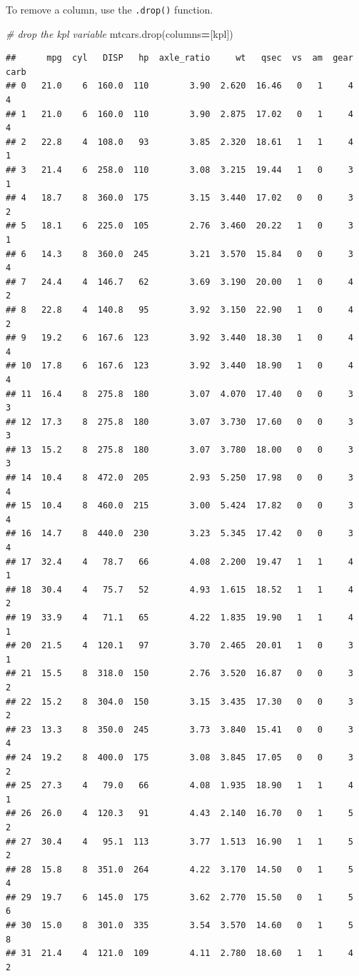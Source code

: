 \documentclass[
]{book}
\newenvironment{Shaded}{\begin{snugshade}}{\end{snugshade}}
\newcommand{\CommentTok}[1]{\textcolor[rgb]{0.56,0.35,0.01}{\textit{#1}}}
\newcommand{\NormalTok}[1]{#1}
\newcommand{\OperatorTok}[1]{\textcolor[rgb]{0.81,0.36,0.00}{\textbf{#1}}}
\newcommand{\StringTok}[1]{\textcolor[rgb]{0.31,0.60,0.02}{#1}}
\begin{document}
To remove a column, use the \texttt{.drop()} function.

\begin{Shaded}
\begin{Highlighting}[]
\CommentTok{\# drop the kpl variable}
\NormalTok{mtcars.drop(columns}\OperatorTok{=}\NormalTok{[}\StringTok{\textquotesingle{}kpl\textquotesingle{}}\NormalTok{])}
\end{Highlighting}
\end{Shaded}

\begin{verbatim}
##      mpg  cyl   DISP   hp  axle_ratio     wt   qsec  vs  am  gear  carb
## 0   21.0    6  160.0  110        3.90  2.620  16.46   0   1     4     4
## 1   21.0    6  160.0  110        3.90  2.875  17.02   0   1     4     4
## 2   22.8    4  108.0   93        3.85  2.320  18.61   1   1     4     1
## 3   21.4    6  258.0  110        3.08  3.215  19.44   1   0     3     1
## 4   18.7    8  360.0  175        3.15  3.440  17.02   0   0     3     2
## 5   18.1    6  225.0  105        2.76  3.460  20.22   1   0     3     1
## 6   14.3    8  360.0  245        3.21  3.570  15.84   0   0     3     4
## 7   24.4    4  146.7   62        3.69  3.190  20.00   1   0     4     2
## 8   22.8    4  140.8   95        3.92  3.150  22.90   1   0     4     2
## 9   19.2    6  167.6  123        3.92  3.440  18.30   1   0     4     4
## 10  17.8    6  167.6  123        3.92  3.440  18.90   1   0     4     4
## 11  16.4    8  275.8  180        3.07  4.070  17.40   0   0     3     3
## 12  17.3    8  275.8  180        3.07  3.730  17.60   0   0     3     3
## 13  15.2    8  275.8  180        3.07  3.780  18.00   0   0     3     3
## 14  10.4    8  472.0  205        2.93  5.250  17.98   0   0     3     4
## 15  10.4    8  460.0  215        3.00  5.424  17.82   0   0     3     4
## 16  14.7    8  440.0  230        3.23  5.345  17.42   0   0     3     4
## 17  32.4    4   78.7   66        4.08  2.200  19.47   1   1     4     1
## 18  30.4    4   75.7   52        4.93  1.615  18.52   1   1     4     2
## 19  33.9    4   71.1   65        4.22  1.835  19.90   1   1     4     1
## 20  21.5    4  120.1   97        3.70  2.465  20.01   1   0     3     1
## 21  15.5    8  318.0  150        2.76  3.520  16.87   0   0     3     2
## 22  15.2    8  304.0  150        3.15  3.435  17.30   0   0     3     2
## 23  13.3    8  350.0  245        3.73  3.840  15.41   0   0     3     4
## 24  19.2    8  400.0  175        3.08  3.845  17.05   0   0     3     2
## 25  27.3    4   79.0   66        4.08  1.935  18.90   1   1     4     1
## 26  26.0    4  120.3   91        4.43  2.140  16.70   0   1     5     2
## 27  30.4    4   95.1  113        3.77  1.513  16.90   1   1     5     2
## 28  15.8    8  351.0  264        4.22  3.170  14.50   0   1     5     4
## 29  19.7    6  145.0  175        3.62  2.770  15.50   0   1     5     6
## 30  15.0    8  301.0  335        3.54  3.570  14.60   0   1     5     8
## 31  21.4    4  121.0  109        4.11  2.780  18.60   1   1     4     2
\end{verbatim}
\end{document}
